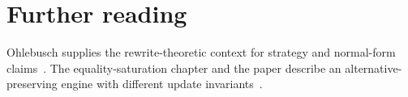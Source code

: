 \section{Further reading}
\label{sec:ch85-reading}
Ohlebusch supplies the rewrite-theoretic context for strategy and normal-form claims~\cite{ohlebusch-2002-rewriting}.
The equality-saturation chapter and the  paper describe an alternative-preserving engine with different update invariants~\cite{willsey-2021-egg}.
